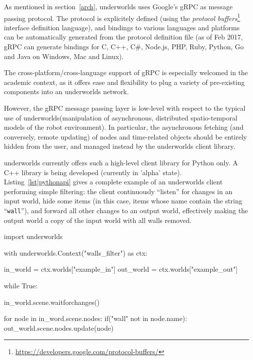 \documentclass[letterpaper, 10 pt, conference]{ieeeconf}  %
\newcommand{\uwds}{{\sc underworlds}\xspace}
\begin{document}
As mentioned in section~\ref{arch}, \uwds uses Google's gRPC as message passing
protocol. The protocol is explicitely defined (using the \emph{protocol
buffers}\footnote{\url{https://developers.google.com/protocol-buffers/}}
interface definition language), and bindings to various languages
and platforms can be automatically generated from the protocol definition file
(as of Feb 2017, gRPC can generate bindings for C, C++, C\#, Node.js, PHP, Ruby,
Python, Go and Java on Windows, Mac and Linux).

The cross-platform/cross-language support of gRPC is especially welcomed in the
academic context, as it offers ease and flexibility to plug a variety of
pre-existing components into an \uwds network.


However, the gRPC message passing layer is low-level with respect to the typical
use of \uwds (manipulation of asynchronous, distributed spatio-temporal models
of the robot environment). In particular, the asynchronous fetching (and
conversely, remote updating) of nodes and time-related objects should be
entirely hidden from the user, and managed instead by the \uwds client library.

\uwds currently offers such a high-level client library for Python only. A C++
library is being developed (currently in 'alpha' state).
Listing~\ref{lst|pythonapi} gives a complete example of an \uwds client
performing simple filtering: the client continuously ``listen'' for changes in
an input world, hide some items (in this case, items whose name contain the
string ``{\tt wall}''), and forward all other changes to an output world,
effectively making the output world a copy of the input world with all walls
removed.

\begin{listing}[h!]

\begin{pythoncode}
import underworlds

with underworlds.Context("walls_filter") as ctx:

    in_world = ctx.worlds["example_in"]
    out_world = ctx.worlds["example_out"]

    while True:

        in_world.scene.waitforchanges()

        for node in in_word.scene.nodes:
            if("wall" not in node.name):
                out_world.scene.nodes.update(node)


\end{pythoncode}
    \caption{Example of a simple yet complete \uwds filter, written in Python, and named {\tt
    walls\_filter}: the client connects to the \uwds network, walkthrough the
    scene graph of world {\tt example\_in}, filter out some objects, and publish
    the remaining objects in the world {\tt example\_out}.}
    
    \label{lst|pythonapi}
\end{listing}
\end{document}
